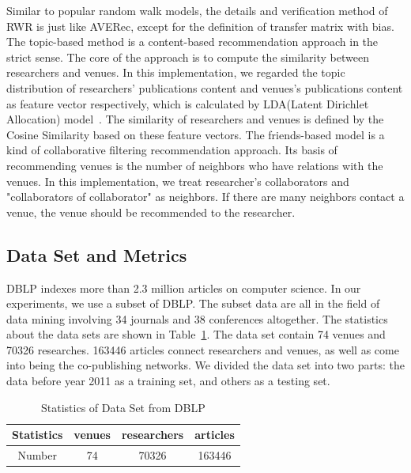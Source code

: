 \documentclass[9pt]{acm_proc_article-sp}
\begin{document}
Similar to popular random walk models, the details and verification method of RWR is just like AVERec, except for the definition of transfer matrix with bias. The topic-based method is a content-based recommendation approach in the strict sense. The core of the approach is to compute the similarity between researchers and venues. In this implementation, we regarded the topic distribution of researchers' publications content and venues's publications content as feature vector respectively, which is calculated by LDA(Latent Dirichlet Allocation) model~\cite{blei2003latent}. The similarity of researchers and venues is defined by the Cosine Similarity based on these feature vectors. The friends-based model is a kind of collaborative filtering recommendation approach. Its basis of recommending venues is the number of neighbors who have relations with the venues. In this implementation, we treat researcher's collaborators and "collaborators of collaborator" as neighbors. If there are many neighbors contact a venue, the venue should be recommended to the researcher.

\subsection{Data Set and Metrics}
DBLP indexes more than 2.3 million articles on computer science. In our experiments, we use a subset of DBLP. The subset data are all in the field of data mining involving 34 journals and 38 conferences altogether. The statistics about the data sets are shown in Table~\ref{table1}. The data set contain 74 venues and 70326 researches. 163446 articles connect researchers and venues, as well as come into being the co-publishing networks. We divided the data set into two parts: the data before year 2011 as a training set, and others as a testing set.

\begin{table}
\renewcommand{\arraystretch}{1.2}
\centering
\caption{Statistics of Data Set from DBLP}
\label{table1}
\begin{tabular}{|c|c|c|c|} \hline
Statistics &venues&researchers&articles\\ \hline
Number & 74 & 70326 &163446 \\
\hline\end{tabular}
\end{table}
\end{document}
